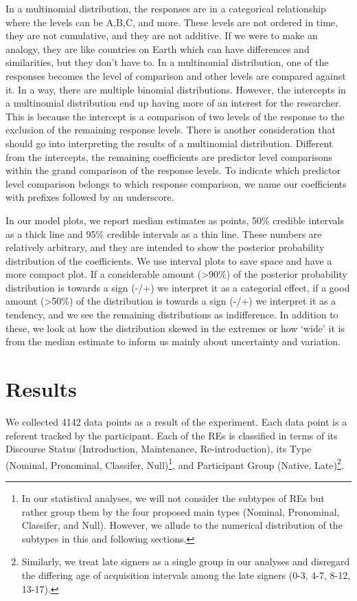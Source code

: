 \documentclass[]{elsarticle} %
\begin{document}
In a multinomial distribution, the responses are in a categorical
relationship where the levels can be A,B,C, and more. These levels are
not ordered in time, they are not cumulative, and they are not additive.
If we were to make an analogy, they are like countries on Earth which
can have differences and similarities, but they don't have to. In a
multinomial distribution, one of the responses becomes the level of
comparison and other levels are compared against it. In a way, there are
multiple binomial distributions. However, the intercepts in a
multinomial distribution end up having more of an interest for the
researcher. This is because the intercept is a comparison of two levels
of the response to the exclusion of the remaining response levels. There
is another consideration that should go into interpreting the results of
a multinomial distribution. Different from the intercepts, the remaining
coefficients are predictor level comparisons within the grand comparison
of the response levels. To indicate which predictor level comparison
belongs to which response comparison, we name our coefficients with
prefixes followed by an underscore.

In our model plots, we report median estimates as points, 50\% credible
intervals as a thick line and 95\% credible intervals as a thin line.
These numbers are relatively arbitrary, and they are intended to show
the posterior probability distribution of the coefficients. We use
interval plots to save space and have a more compact plot. If a
considerable amount (\textgreater90\%) of the posterior probability
distribution is towards a sign (-/+) we interpret it as a categorial
effect, if a good amount (\textgreater50\%) of the distribution is
towards a sign (-/+) we interpret it as a tendency, and we see the
remaining distributions as indifference. In addition to these, we look
at how the distribution skewed in the extremes or how `wide' it is from
the median estimate to inform us mainly about uncertainty and variation.

\hypertarget{results}{%
\section{Results}\label{results}}

We collected 4142 data points as a result of the experiment. Each data
point is a referent tracked by the participant. Each of the REs is
classified in terms of its Discourse Status (Introduction, Maintenance,
Re-introduction), its Type (Nominal, Pronominal, Classifer,
Null)\footnote{In our statistical analyses, we will not consider the subtypes of REs but rather group them by the four proposed main types (Nominal, Pronominal, Classifer, and Null). However, we allude to the numerical distribution of the subtypes in this and following sections.},
and Participant Group (Native,
Late)\footnote{Similarly, we treat late signers as a single group in our analyses and disregard the differing age of acquisition intervals among the late signers (0-3, 4-7, 8-12, 13-17).}.
\end{document}
